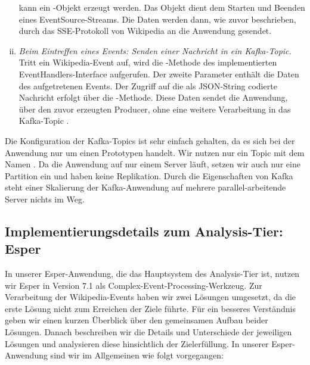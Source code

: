\begin{enumerate}[i.]
    kann ein -Objekt erzeugt werden. Das Objekt dient dem Starten und Beenden eines EventSource-Streams.
    Die Daten werden dann, wie zuvor beschrieben, durch das SSE-Protokoll von Wikipedia an die Anwendung gesendet.
    \item \textit{Beim Eintreffen eines Events: Senden einer Nachricht in ein Kafka-Topic.} Tritt ein Wikipedia-Event auf,
    wird die -Methode des implementierten EventHandlers-Interface aufgerufen. Der zweite Parameter enthält die Daten
    des aufgetretenen Events. Der Zugriff auf die als JSON-String codierte Nachricht erfolgt über die -Methode.
    Diese Daten sendet die Anwendung, über den zuvor erzeugten Producer, ohne eine weitere
    Verarbeitung in das Kafka-Topic .
\end{enumerate}

Die Konfiguration der Kafka-Topics ist sehr einfach gehalten, da es sich bei der Anwendung nur um einen Prototypen handelt.
Wir nutzen nur ein Topic mit dem Namen . Da die Anwendung auf nur einem Server läuft, setzen wir auch nur
eine Partition ein und haben keine Replikation. Durch die Eigenschaften von Kafka steht einer Skalierung der Kafka-Anwendung
auf mehrere parallel-arbeitende Server nichts im Weg.

\subsection{Implementierungsdetails zum Analysis-Tier: Esper}
In unserer Esper-Anwendung, die das Hauptsystem des Analysis-Tier ist, nutzen wir Esper in Version 7.1
als Complex-Event-Processing-Werkzeug.
Zur Verarbeitung der Wikipedia-Events haben wir zwei Lösungen umgesetzt, da die erste Lösung nicht
zum Erreichen der Ziele führte. Für ein besseres Verständnis geben wir einen kurzen Überblick über den gemeinsamen Aufbau beider
Lösungen. Danach beschreiben wir die Details und Unterschiede der jeweiligen Lösungen und analysieren diese hinsichtlich der
Zielerfüllung.
In unserer Esper-Anwendung sind wir im Allgemeinen wie folgt vorgegangen:

